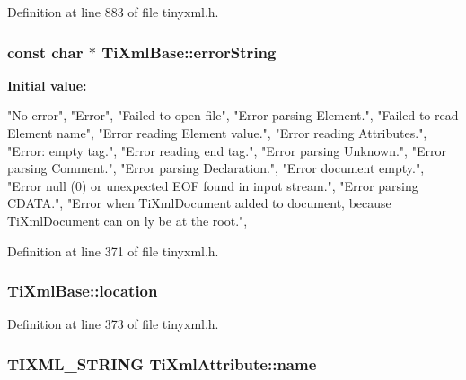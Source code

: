 Definition at line 883 of file tinyxml.h.

\hypertarget{classTiXmlBase_a7ac8feec4100e446b3d78e1ac0659700}{
\subsubsection[{errorString}]{\setlength{\rightskip}{0pt plus 5cm}const char $\ast$ {\bf TiXmlBase::errorString}}}
\label{d8/d47/classTiXmlBase_a7ac8feec4100e446b3d78e1ac0659700}
{\bfseries Initial value:}
\begin{DoxyCode}

{
        "No error",
        "Error",
        "Failed to open file",
        "Error parsing Element.",
        "Failed to read Element name",
        "Error reading Element value.",
        "Error reading Attributes.",
        "Error: empty tag.",
        "Error reading end tag.",
        "Error parsing Unknown.",
        "Error parsing Comment.",
        "Error parsing Declaration.",
        "Error document empty.",
        "Error null (0) or unexpected EOF found in input stream.",
        "Error parsing CDATA.",
        "Error when TiXmlDocument added to document, because TiXmlDocument can on
      ly be at the root.",
}
\end{DoxyCode}


Definition at line 371 of file tinyxml.h.

\hypertarget{classTiXmlBase_a0d992580f3bc264909f898e942677a3c}{
\subsubsection[{location}]{ {\bf TiXmlBase::location}}}
\label{d8/d47/classTiXmlBase_a0d992580f3bc264909f898e942677a3c}


Definition at line 373 of file tinyxml.h.

\hypertarget{classTiXmlAttribute_afcbe165f33f08cf9b24daa33f0ee951a}{
\subsubsection[{name}]{\setlength{\rightskip}{0pt plus 5cm}TIXML\_\-STRING {\bf TiXmlAttribute::name}}}
\label{d4/dc1/classTiXmlAttribute_afcbe165f33f08cf9b24daa33f0ee951a}


